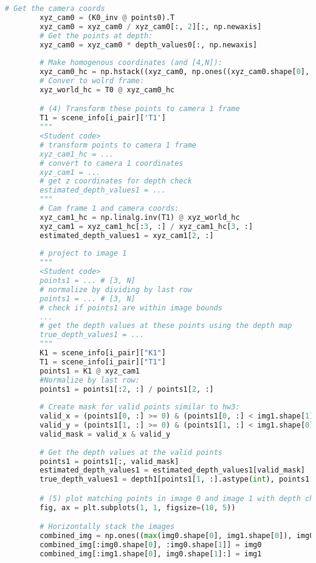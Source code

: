 \documentclass{article}
\begin{document}
\begin{lstlisting}[language=Python]
        # Get the camera coords
        xyz_cam0 = (K0_inv @ points0).T
        xyz_cam0 = xyz_cam0 / xyz_cam0[:, 2][:, np.newaxis]
        # Get the points at depth:
        xyz_cam0 = xyz_cam0 * depth_values0[:, np.newaxis]
        
        # Make homogenous coordinates (and [4,N]):
        xyz_cam0_hc = np.hstack((xyz_cam0, np.ones((xyz_cam0.shape[0], 1)))).T
        # Conver to wolrd frame:
        xyz_world_hc = T0 @ xyz_cam0_hc

        # (4) Transform these points to camera 1 frame
        T1 = scene_info[i_pair]['T1']
        """
        <Student code>
        # transform points to camera 1 frame
        xyz_cam1_hc = ...
        # convert to camera 1 coordinates
        xyz_cam1 = ...
        # get z coordinates for depth check
        estimated_depth_values1 = ...
        """
        # Cam frame 1 and camera coords:
        xyz_cam1_hc = np.linalg.inv(T1) @ xyz_world_hc
        xyz_cam1 = xyz_cam1_hc[:3, :] / xyz_cam1_hc[3, :]
        estimated_depth_values1 = xyz_cam1[2, :]
        
        # project to image 1
        """
        <Student code>
        points1 = ... # [3, N]
        # normalize by dividing by last row
        points1 = ... # [3, N]
        # check if points1 are within image bounds
        ...
        # get the depth values at these points using the depth map
        true_depth_values1 = ...
        """
        K1 = scene_info[i_pair]["K1"]
        T1 = scene_info[i_pair]["T1"]
        points1 = K1 @ xyz_cam1
        #Normalize by last row:
        points1 = points1[:2, :] / points1[2, :]
        
        # Create mask for valid points similar to hw3:
        valid_x = (points1[0, :] >= 0) & (points1[0, :] < img1.shape[1])
        valid_y = (points1[1, :] >= 0) & (points1[1, :] < img1.shape[0])
        valid_mask = valid_x & valid_y
        
        # Get the depth values at the valid points
        points1 = points1[:, valid_mask]
        estimated_depth_values1 = estimated_depth_values1[valid_mask]
        true_depth_values1 = depth1[points1[1, :].astype(int), points1[0, :].astype(int)]

        # (5) plot matching points in image 0 and image 1 with depth check such that the depth values match
        fig, ax = plt.subplots(1, 1, figsize=(10, 5))

        # Horizontally stack the images
        combined_img = np.ones((max(img0.shape[0], img1.shape[0]), img0.shape[1] + img1.shape[1], 3), dtype=np.uint8) * 255
        combined_img[:img0.shape[0], :img0.shape[1]] = img0
        combined_img[:img1.shape[0], img0.shape[1]:] = img1


\end{lstlisting}
\end{document}
